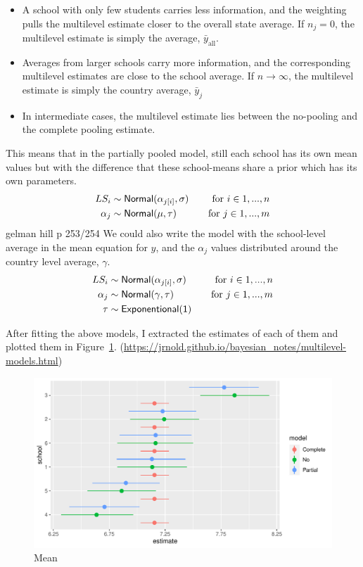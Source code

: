 \documentclass[a4, 12pt]{article}
\begin{document}
\begin{itemize}
\item A school with only few students carries less information, and the weighting pulls the multilevel estimate closer to the overall state average. If $n_j=0$, the multilevel estimate is simply the average, $\bar y_{\mathrm {all}}$.
\item Averages from larger schools carry more information, and the corresponding multilevel estimates are close to the school average. If $n \rightarrow \infty$, the multilevel estimate is simply the country average, $\bar y_j$
\item In intermediate cases, the multilevel estimate lies between the no-pooling and the complete pooling estimate.
\end{itemize}

This means that in the partially pooled model, still each school has its own mean values but with the difference that these school-means share a prior which has its own parameters.
\begin{align*}
LS_i & \sim {\sf Normal} (\alpha_{j[i]}, \sigma) & \quad \text{for } i \in 1,...,n \\
\alpha_{j} & \sim {\sf Normal} (\mu, \tau) & \quad \text{for } j \in 1,...,m
\end{align*} gelman hill p 253/254
We could also write the model with the school-level average in the mean equation for \(y\), and the \(\alpha_j\) values distributed around the country level average, \(\gamma\).
\begin{align*}
LS_i & \sim {\sf Normal} (\alpha_{j[i]}, \sigma) & \quad \text{for } i \in 1,...,n \\
\alpha_{j} & \sim {\sf Normal} (\gamma, \tau) & \quad \text{for } j \in 1,...,m \\
\tau & \sim {\sf Exponentional(1)}
\end{align*}

After fitting the above models, I extracted the estimates of each of them and plotted them in Figure~\ref{fig:compare-models}. (\url{https://jrnold.github.io/bayesian_notes/multilevel-models.html})

\begin{figure}[H]

{\centering \includegraphics[width=0.8\linewidth,]{../figures/compare_models} 

}

\caption{Mean}\label{fig:compare-models}
\end{figure}
\end{document}
